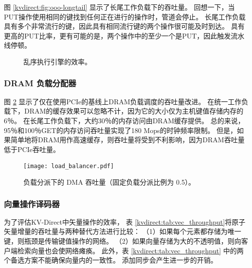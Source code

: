 图 \ref {kvdirect:fig:ooo-longtail} 显示了长尾工作负载下的吞吐量。
回想一下，当PUT操作使用相同的键找到任何正在进行的操作时，管道会停止。
长尾工作负载具有多个非常流行的键，因此具有相同流行键的两个操作很可能及时到达。
具有更高的PUT比率，更有可能的是，两个操作中的至少一个是PUT，因此触发流水线停顿。


\begin{figure}[t]
	\centering
	\caption{乱序执行引擎的效率。}
	\label{kvdirect:fig:ooo-eval}
\end{figure}

\subsubsection{DRAM 负载分配器}
\label{kvdirect:sec:dram-eval}

图 \ref {kvdirect:fig:cache-tput} 显示了仅在使用PCIe的基线上DRAM负载调度的吞吐量改进。
在统一工作负载下，DRAM的缓存效果可以忽略不计，因为它的大小仅为主机键值存储内存的6％。
在长尾工作负载下，大约30％的内存访问由DRAM缓存提供。 总的来说，95％和100％GET的内存访问吞吐量实现了180 Mops的时钟频率限制。
但是，如果简单地将DRAM用作高速缓存，则吞吐量将受到不利影响，因为DRAM吞吐量低于PCIe吞吐量。


\begin{figure}[t]
	\centering
	{\texttt{[image: load\_balancer.pdf]}}
	\caption{负载分派下的 DMA 吞吐量（固定负载分派比例为 0.5）。}
	\label{kvdirect:fig:cache-tput}
\end{figure}


\subsubsection{向量操作译码器}
\label{kvdirect:network-eval}


为了评估KV-Direct中矢量操作的效率，
表 \ref {kvdirect:tab:vec_throughput}将原子矢量增量的吞吐量与两种替代方法进行比较：
（1）如果每个元素都存储为唯一键，则瓶颈是传输键值操作的网络。
（2）如果向量存储为大的不透明值，则向客户端检索向量也会使网络瘫痪。
此外，表 \ref {kvdirect:tab:vec_throughput} 中的两个备选方案不能确保向量内的一致性。 添加同步会产生进一步的开销。


